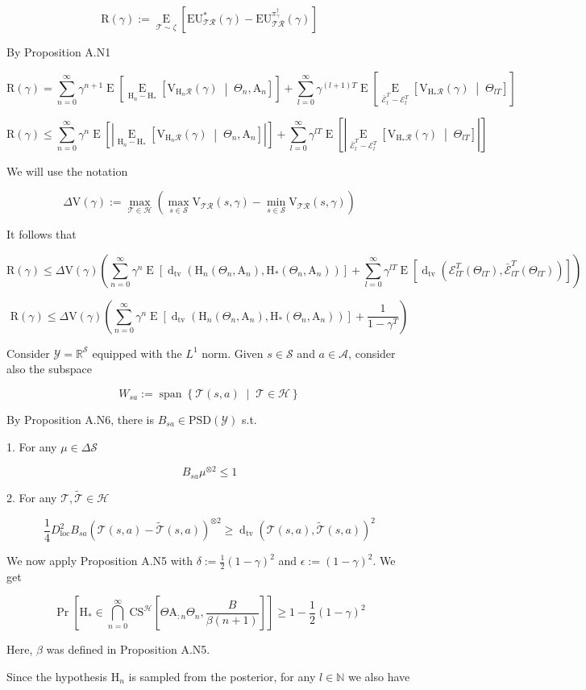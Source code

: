 \documentclass[a4paper]{article}
\DeclareMathOperator{\Sp}{span}
\newcommand{\AP}[1]{\left(#1\right)}
\newcommand{\AB}[1]{\left[#1\right]}
\newcommand{\ABM}[2]{\left[#1\;\middle\vert\;#2\right]}
\newcommand{\ACM}[2]{\left\{#1\;\middle\vert\;#2\right\}}
\newcommand{\Pa}[2]{\underset{#1}{\operatorname{Pr}}\AB{#2}}
\newcommand{\Ea}[2]{\underset{#1}{\operatorname{E}}\AB{#2}}
\newcommand{\CE}[3]{\underset{#1}{\operatorname{E}}\ABM{#2}{#3}}
\newcommand{\Dtva}[1]{\operatorname{d}_{\text{tv}}\AP{#1}}
\newcommand{\Nats}{\mathbb{N}}
\newcommand{\Reals}{\mathbb{R}}
\newcommand{\PSD}{\mathrm{PSD}}
\newcommand{\Abs}[1]{\left\vert #1 \right\vert}
\newcommand{\B}{B}
\newcommand{\Y}{\mathcal{Y}}
\newcommand{\St}{\mathcal{S}}
\newcommand{\A}{\mathcal{A}}
\newcommand{\R}{\mathcal{R}}
\newcommand{\T}{\mathcal{T}}
\newcommand{\Hy}{\mathcal{H}}
\newcommand{\DL}{D_{\mathrm{loc}}}
\newcommand{\V}{\mathrm{V}}
\newcommand{\EU}{\mathrm{EU}}
\newcommand{\Reg}{\mathrm{R}}
\newcommand{\CS}{\mathrm{CS}}
\newcommand{\AT}{\mathrm{A}}
\newcommand{\THy}{\mathrm{H}_*}
\newcommand{\SHy}{\mathrm{H}}
\newcommand{\Ev}{\mathcal{E}}
\newcommand{\De}{\Delta}
\begin{document}
$$\Reg(\gamma):=\Ea{\T\sim\zeta}{\EU^*_{\T\R}(\gamma)-\EU^{\pi_{\gamma}^{\dagger}}_{\T\R}(\gamma)}$$

By Proposition A.N1

$$\Reg(\gamma)=\sum_{n=0}^\infty\gamma^{n+1}\Ea{}{\CE{\SHy_n-\THy}{\V_{\SHy_n\R}(\gamma)}{\Theta_n,\AT_n}}+\sum_{l=0}^\infty{\gamma^{(l+1)T}}\Ea{}{\CE{\bar{\Ev}_{l}^T-\Ev_{l}^T}{\V_{\SHy_*\R}(\gamma)}{\Theta_{lT}}}$$

$$\Reg(\gamma)\leq\sum_{n=0}^\infty\gamma^{n}\Ea{}{\Abs{\CE{\SHy_n-\THy}{\V_{\SHy_n\R}(\gamma)}{\Theta_n,\AT_n}}}+\sum_{l=0}^\infty{\gamma^{lT}}\Ea{}{\Abs{\CE{\bar{\Ev}_{l}^T-\Ev_{l}^T}{\V_{\SHy_*\R}(\gamma)}{\Theta_{lT}}}}$$

We will use the notation

$$\De\V(\gamma):=\max_{\T\in\Hy}{\AP{\max_{s\in\St}{\V_{\T\R}(s,\gamma)}-\min_{s\in\St}{\V_{\T\R}(s,\gamma)}}}$$

It follows that

$$\Reg(\gamma)\leq\Delta\V(\gamma)\AP{\sum_{n=0}^\infty\gamma^{n}\Ea{}{\Dtva{\SHy_n\AP{\Theta_n,\AT_n},\THy\AP{\Theta_n,\AT_n}} }+\sum_{l=0}^\infty\gamma^{lT}\Ea{}{\Dtva{\Ev_{lT}^T\AP{\Theta_{lT}},\bar{\Ev}_{lT}^T\AP{\Theta_{lT}}}}}$$

$$\Reg(\gamma)\leq\Delta\V(\gamma)\AP{\sum_{n=0}^\infty\gamma^{n}\Ea{}{\Dtva{\SHy_n\AP{\Theta_n,\AT_n},\THy\AP{\Theta_n,\AT_n}} }+\frac{1}{1-\gamma^T}}$$

Consider $\Y=\Reals^\St$ equipped with the $L^1$ norm. Given $s\in\St$ and $a\in\A$, consider also the subspace

$$W_{sa}:=\Sp\ACM{\T(s,a)}{\T\in\Hy}$$

By Proposition A.N6, there is $\B_{sa}\in\PSD\AP{\Y}$ s.t.

1. For any $\mu\in\Delta\St$

$$\B_{sa}\mu^{\otimes2}\leq1$$

2. For any $\T,\tilde{\T}\in\Hy$

$$\frac{1}{4}\DL^2 B_{sa}\AP{\T(s,a)-\tilde{\T}(s,a)}^{\otimes2} \geq \Dtva{\T(s,a),\tilde{\T}(s,a)}^2$$

We now apply Proposition A.N5 with $\delta:=\frac{1}{2}(1-\gamma)^2$ and $\epsilon:=(1-\gamma)^2$. We get

$$\Pa{}{\SHy_*\in\bigcap_{n=0}^\infty\CS^\Hy\AB{\Theta\AT_{:n}\Theta_n,\frac{\B }{\beta(n+1)}}} \geq 1-\frac{1}{2}(1-\gamma)^2$$

Here, $\beta$ was defined in Proposition A.N5.

Since the hypothesis $\SHy_n$ is sampled from the posterior, for any $l\in\Nats$ we also have
\end{document}
